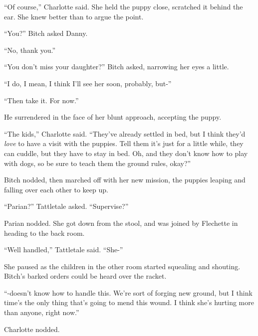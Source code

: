 ``Of course,'' Charlotte said.  She held the puppy close, scratched it behind the ear.  She knew better than to argue the point.



``You?'' Bitch asked Danny.



``No, thank you.''



``You don't miss your daughter?'' Bitch asked, narrowing her eyes a little.



``I do, I mean, I think I'll see her soon, probably, but-''



``Then take it.  For now.''



He surrendered in the face of her blunt approach, accepting the puppy.



``The kids,'' Charlotte said.  ``They've already settled in bed, but I think they'd \emph{love} to have a visit with the puppies.  Tell them it's just for a little while, they can cuddle, but they have to stay in bed.  Oh, and they don't know how to play with dogs, so be sure to teach them the ground rules, okay?''



Bitch nodded, then marched off with her new mission, the puppies leaping and falling over each other to keep up.



``Parian?'' Tattletale asked.  ``Supervise?''



Parian nodded.  She got down from the stool, and was joined by Flechette in heading to the back room.



``Well handled,'' Tattletale said.  ``She-''



She paused as the children in the other room started squealing and shouting.  Bitch's barked orders could be heard over the racket.



``-doesn't know how to handle this.  We're sort of forging new ground, but I think time's the only thing that's going to mend this wound.  I think she's hurting more than anyone, right now.''



Charlotte nodded.



